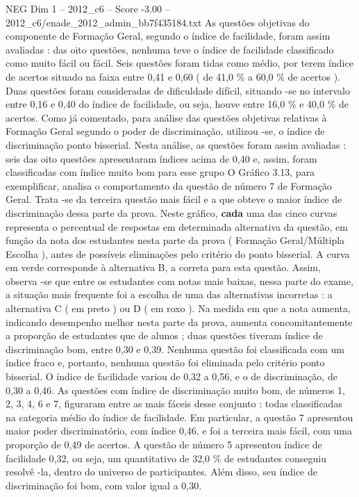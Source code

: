 \begin{textsample}{NEG Dim 1 – 2012\_c6 – Score -3.00 – 2012\_c6/enade\_2012\_admin\_bb7f435184.txt}
As questões objetivas do componente de Formação Geral, segundo o índice de facilidade, foram assim avaliadas : das oito questões, nenhuma teve o índice de facilidade classificado como muito fácil ou fácil.
Seis questões foram tidas como médio, por terem índice de acertos situado na faixa entre 0,41 e 0,60 ( de 41,0 \% a 60,0 \% de acertos ).
Duas questões foram consideradas de dificuldade difícil, situando -se no intervalo entre 0,16 e 0,40 do índice de facilidade, ou seja, houve entre 16,0 \% e 40,0 \% de acertos.
Como já comentado, para análise das questões objetivas relativas à Formação Geral segundo o poder de discriminação, utilizou -se, o índice de discriminação ponto bisserial.
Nesta análise, as questões foram assim avaliadas : seis das oito questões apresentaram índices acima de 0,40 e, assim, foram classificadas com índice muito bom para esse grupo O Gráfico 3.13, para exemplificar, analisa o comportamento da questão de número 7 de Formação Geral.
Trata -se da terceira questão mais fácil e a que obteve o maior índice de discriminação dessa parte da prova.
Neste gráfico, \textbf{cada} uma das cinco curvas representa o percentual de respostas em determinada alternativa da questão, em função da nota dos estudantes nesta parte da prova ( Formação Geral/Múltipla Escolha ), antes de possíveis eliminações pelo critério do ponto bisserial.
A curva em verde corresponde à alternativa B, a correta para esta questão.
Assim, observa -se que entre os estudantes com notas mais baixas, nessa parte do exame, a situação mais frequente foi a escolha de uma das alternativas incorretas : a alternativa C ( em preto ) ou D ( em roxo ).
Na medida em que a nota aumenta, indicando desempenho melhor nesta parte da prova, aumenta concomitantemente a proporção de estudantes que de alunos ; duas questões tiveram índice de discriminação bom, entre 0,30 e 0,39.
Nenhuma questão foi classificada com um índice fraco e, portanto, nenhuma questão foi eliminada pelo critério ponto bisserial.
O índice de facilidade variou de 0,32 a 0,56, e o de discriminação, de 0,30 a 0,46.
As questões com índice de discriminação muito bom, de números 1, 2, 3, 4, 6 e 7, figuraram entre as mais fáceis desse conjunto : todas classificadas na categoria médio do índice de facilidade.
Em particular, a questão 7 apresentou maior poder discriminatório, com índice 0,46, e foi a terceira mais fácil, com uma proporção de 0,49 de acertos.
A questão de número 5 apresentou índice de facilidade 0,32, ou seja, um quantitativo de 32,0 \% de estudantes conseguiu resolvê -la, dentro do universo de participantes.
Além disso, seu índice de discriminação foi bom, com valor igual a 0,30.

\end{textsample}
